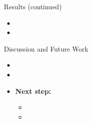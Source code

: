 \documentclass{beamer}
\newlength{\colwidth}
\begin{document}
\begin{frame}[t]
\begin{columns}[t]
\begin{column}{\colwidth}
\begin{block}{Results (continued)}
    \lipsum[1][1]
    \begin{itemize}
        \item \lipsum[1][1-3]
        \item \lipsum[1][1-3]
    \end{itemize}
    
    

  \end{block}
  \begin{exampleblock}{Discussion and Future Work}
  \begin{itemize}
      \item \lipsum[1][1]
      \item \lipsum[1][1]
      
      \item \textbf{Next step:} 
      \begin{itemize}
          \item \lipsum[1][1-2]
          \item \lipsum[1][1-2]
      \end{itemize}
  \end{itemize}
  \end{exampleblock}
    


\end{column}
\end{columns}

\end{frame}
\end{document}
